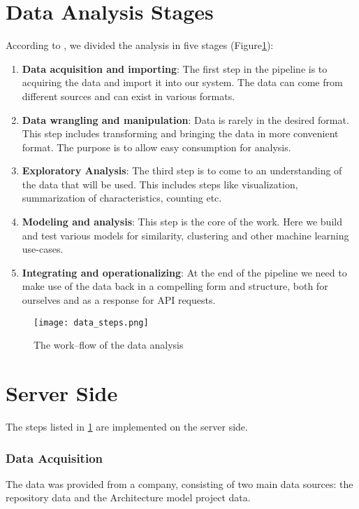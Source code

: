 \section{Data Analysis Stages} \label{sec:steps}
According to \cite{Ojeda:2014:PDS:2721420}, we divided the analysis in five stages (Figure\ref{fig:datasteps}):
\begin{enumerate}
	\item \textbf{Data acquisition and importing}: 
	The first step in the pipeline is to acquiring the data and import it into our system. 
	The data can come from different sources and can exist in various formats.
	\item \textbf{Data wrangling and manipulation}: 
	Data is rarely in the desired format. 
	This step includes transforming and bringing the data in more convenient format.
	The purpose is to allow easy consumption for analysis.
	\item \textbf{Exploratory Analysis}: 
	The third step is to come to an understanding of the data that will be used. 
	This includes steps like visualization, summarization of characteristics, counting etc.
	\item \textbf{Modeling and analysis}: 
	This step is the core of the work. 
	Here we build and test various models for similarity, clustering and other machine learning use-cases.
	\item \textbf{Integrating and operationalizing}: 
	At the end of the pipeline we need to make use of the data back in a compelling form and structure,
	both for ourselves and as a response for API requests. 
\end{enumerate}

\begin{figure}[ht]
	\centering
	\texttt{[image: data\_steps.png]}
	\caption{The work--flow of the data analysis} 
	\label{fig:datasteps}
\end{figure}

\section{Server Side}
The steps listed in \ref{sec:steps} are implemented on the server side.
\subsubsection{Data Acquisition}
The data was provided from a company, consisting of two main data sources: 
the repository data and the Architecture model project data.

